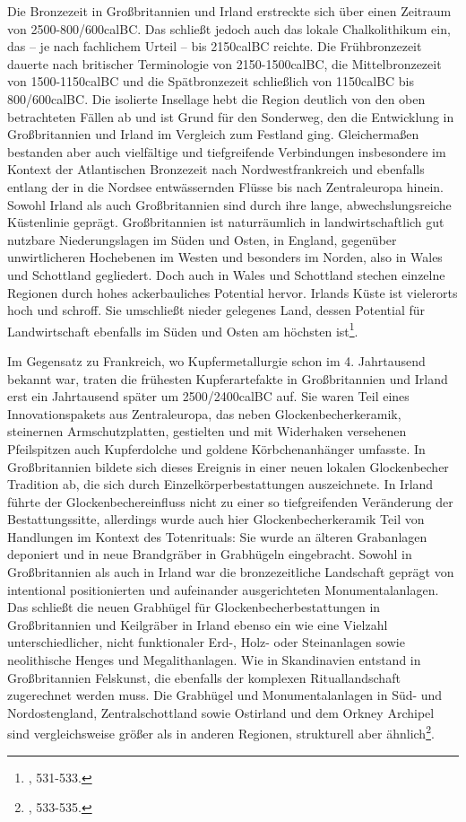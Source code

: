 \documentclass[openany,twoside,twocolumn]{book}
\let\rmarkdownfootnote\footnote%
\def\footnote{\protect\rmarkdownfootnote}
\begin{document}
Die Bronzezeit in Großbritannien und Irland erstreckte sich über einen Zeitraum von 2500-800/600calBC. Das schließt jedoch auch das lokale Chalkolithikum ein, das -- je nach fachlichem Urteil -- bis 2150calBC reichte. Die Frühbronzezeit dauerte nach britischer Terminologie von 2150-1500calBC, die Mittelbronzezeit von 1500-1150calBC und die Spätbronzezeit schließlich von 1150calBC bis 800/600calBC. Die isolierte Insellage hebt die Region deutlich von den oben betrachteten Fällen ab und ist Grund für den Sonderweg, den die Entwicklung in Großbritannien und Irland im Vergleich zum Festland ging. Gleichermaßen bestanden aber auch vielfältige und tiefgreifende Verbindungen insbesondere im Kontext der Atlantischen Bronzezeit nach Nordwestfrankreich und ebenfalls entlang der in die Nordsee entwässernden Flüsse bis nach Zentraleuropa hinein. Sowohl Irland als auch Großbritannien sind durch ihre lange, abwechslungsreiche Küstenlinie geprägt. Großbritannien ist naturräumlich in landwirtschaftlich gut nutzbare Niederungslagen im Süden und Osten, in England, gegenüber unwirtlicheren Hochebenen im Westen und besonders im Norden, also in Wales und Schottland gegliedert. Doch auch in Wales und Schottland stechen einzelne Regionen durch hohes ackerbauliches Potential hervor. Irlands Küste ist vielerorts hoch und schroff. Sie umschließt nieder gelegenes Land, dessen Potential für Landwirtschaft ebenfalls im Süden und Osten am höchsten ist\footnote{\textcite{roberts_britain_2013}, 531-533.}.

Im Gegensatz zu Frankreich, wo Kupfermetallurgie schon im 4. Jahrtausend bekannt war, traten die frühesten Kupferartefakte in Großbritannien und Irland erst ein Jahrtausend später um 2500/2400calBC auf. Sie waren Teil eines Innovationspakets aus Zentraleuropa, das neben Glockenbecherkeramik, steinernen Armschutzplatten, gestielten und mit Widerhaken versehenen Pfeilspitzen auch Kupferdolche und goldene Körbchenanhänger umfasste. In Großbritannien bildete sich dieses Ereignis in einer neuen lokalen Glockenbecher Tradition ab, die sich durch Einzelkörperbestattungen auszeichnete. In Irland führte der Glockenbechereinfluss nicht zu einer so tiefgreifenden Veränderung der Bestattungssitte, allerdings wurde auch hier Glockenbecherkeramik Teil von Handlungen im Kontext des Totenrituals: Sie wurde an älteren Grabanlagen deponiert und in neue Brandgräber in Grabhügeln eingebracht. Sowohl in Großbritannien als auch in Irland war die bronzezeitliche Landschaft geprägt von intentional positionierten und aufeinander ausgerichteten Monumentalanlagen. Das schließt die neuen Grabhügel für Glockenbecherbestattungen in Großbritannien und Keilgräber in Irland ebenso ein wie eine Vielzahl unterschiedlicher, nicht funktionaler Erd-, Holz- oder Steinanlagen sowie neolithische Henges und Megalithanlagen. Wie in Skandinavien entstand in Großbritannien Felskunst, die ebenfalls der komplexen Rituallandschaft zugerechnet werden muss. Die Grabhügel und Monumentalanlagen in Süd- und Nordostengland, Zentralschottland sowie Ostirland und dem Orkney Archipel sind vergleichsweise größer als in anderen Regionen, strukturell aber ähnlich\footnote{\textcite{roberts_britain_2013}, 533-535.}.
\end{document}
